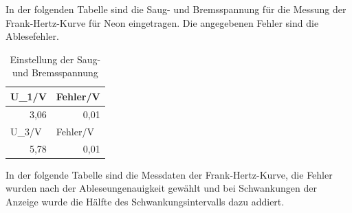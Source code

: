 \documentclass[12pt,a4paper]{article}
\begin{document}
In der folgenden Tabelle sind die Saug- und Bremsspannung für die Messung der Frank-Hertz-Kurve für Neon eingetragen. Die angegebenen Fehler sind die Ablesefehler.

\begin{table}[htbp]
\caption{Einstellung der Saug- und Bremsspannung}
\begin{center}
\begin{tabular}{|l|l|}
\hline
U\_1/V & Fehler/V \\ \hline
\multicolumn{1}{|r|}{3,06} & \multicolumn{1}{r|}{0,01} \\ \hline
U\_3/V & Fehler/V \\ \hline
\multicolumn{1}{|r|}{5,78} & \multicolumn{1}{r|}{0,01} \\ \hline
\end{tabular}
\end{center}
\label{tab:material}
\end{table}

\newpage

In der folgende Tabelle sind die Messdaten der Frank-Hertz-Kurve, die Fehler wurden nach der Ableseungenauigkeit gewählt und bei Schwankungen der Anzeige wurde die Hälfte des Schwankungsintervalls dazu addiert.
\end{document}
